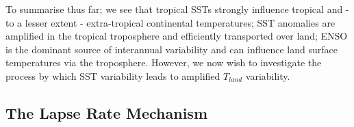 To summarise thus far; we see that tropical SSTs strongly influence tropical and 
- to a lesser extent - extra-tropical continental temperatures; SST anomalies 
are amplified in the tropical troposphere and efficiently transported over land; 
ENSO is the dominant source of interannual variability and can influence land 
surface temperatures via the troposphere. However, we now wish to investigate the 
process by which SST variability leads to amplified $T_{land}$ variability.  



\clearpage

\subsection{The Lapse Rate Mechanism}
\label{mech_lapse}


